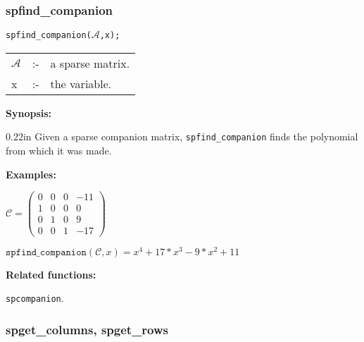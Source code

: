 \subsubsection{spfind\_companion}

\hspace*{0.175in} \texttt{spfind\_companion($\mathcal{A}$,x);}

\hspace*{0.1in} 
\begin{tabular}{l l l}
$\mathcal{A}$ &:-& a sparse matrix. \\
x          &:-& the variable.
\end{tabular}

\textbf{Synopsis:} 

\begin{addtolength}{\leftskip}{0.22in}
  Given a sparse companion matrix, \texttt{spfind\_companion} finds the polynomial 
from which it was made.

\end{addtolength}


\textbf{Examples:}

\begin{flushleft}
\hspace*{0.175in}
\begin{math}  
\mathcal{C} = \left( \begin{array}{cccc} 0 & 0 & 0 & -11 \\ 1 & 0 & 0 & 0 
\\ 0 & 1 & 0 & 9 \\ 0 & 0 & 1 & -17 
\end{array} \right)
\end{math}  
\end{flushleft}

\vspace*{3mm}

\begin{flushleft}
\hspace*{0.175in}
\begin{math}  
\texttt{spfind\_companion}(\mathcal{C},x) = x^4+17*x^3-9*x^2+11
\end{math}  
\end{flushleft}

\vspace*{3mm}

\textbf{Related functions:}

\hspace*{0.175in} \texttt{spcompanion}.

\subsubsection{spget\_columns, spget\_rows}

